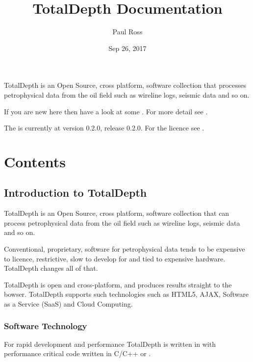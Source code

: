 \documentclass[letterpaper,10pt,english]{sphinxmanual}
\title{TotalDepth Documentation}
\date{Sep 26, 2017}
\author{Paul Ross}
\begin{document}
\maketitle
\sphinxtableofcontents
{}\label{\detokenize{index::doc}}


TotalDepth is an Open Source, cross platform, software collection that processes petrophysical data from the oil field such as wireline logs, seismic data and so on.

If you are new here then have a look at some {\hyperref[\detokenize{examples/examples:totaldepth-examples}]{}}. For more detail see {\hyperref[\detokenize{intro:totaldepth-intro}]{}}.

The  is currently at  version 0.2.0, release 0.2.0. For the licence see {\hyperref[\detokenize{licence:licence-text}]{}}.


\chapter{Contents}
\label{\detokenize{index:contents}}\label{\detokenize{index:totaldepth}}

\section{Introduction to TotalDepth}
\label{\detokenize{intro:totaldepth-intro}}\label{\detokenize{intro::doc}}\label{\detokenize{intro:introduction-to-totaldepth}}
TotalDepth is an Open Source, cross platform, software collection that can process petrophysical data from the oil field such as wireline logs, seismic data and so on.

Conventional, proprietary, software for petrophysical data tends to be expensive to licence, restrictive, slow to develop for and tied to expensive hardware. TotalDepth changes all of that.

TotalDepth is open and cross-platform, and produces results straight to the bowser. TotalDepth supports such technologies such as HTML5, AJAX, Software as a Service (SaaS) and Cloud Computing.


\subsection{Software Technology}
\label{\detokenize{intro:software-technology}}
For rapid development and performance TotalDepth is written in  with performance critical code written in C/C++ or .
\end{document}
